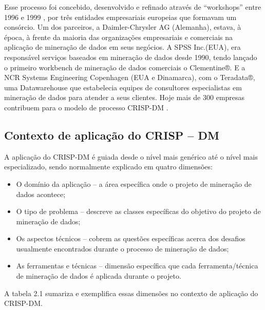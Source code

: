 Esse processo foi concebido, desenvolvido e refinado através de ``workshops'' entre 1996 e 1999 \cite{Crisp2000}, por três entidades empresariais europeias que 
formavam um consórcio. Um dos parceiros, a Daimler-Chrysler AG (Alemanha), estava, à época, à frente da maioria das organizações empresariais e comerciais 
na aplicação de mineração de dados em seus negócios. A
SPSS Inc.(EUA), era responsável serviços baseados em mineração de dados desde 1990, tendo lançado o primeiro workbench de mineração 
de dados comerciais o Clementine®. 
E a NCR Systems Engineering Copenhagen (EUA e Dinamarca), com o Teradata®, uma Datawarehouse que estabelecia equipes de consultores especialistas em mineração 
de dados para atender a seus clientes. Hoje mais de 300 empresas contribuem para o modelo de processo CRISP-DM \cite{chapman2000crisp}.

\subsection{Contexto de aplicação do CRISP -- DM}

A aplicação do CRISP-DM \cite{Crisp2000} é guiada desde o nível mais genérico até o nível mais 
especializado, sendo normalmente explicado em quatro dimensões:

\begin{itemize}
 \item O domínio da aplicação -- a área específica onde o projeto de mineração de dados acontece;
 \item O tipo de problema -- descreve as classes específicas do objetivo do projeto de mineração de dados;
 \item Os aspectos técnicos -- cobrem as questões específicas acerca dos desafios usualmente encontrados durante o processo de mineração de dados; 
 \item As ferramentas e técnicas -- dimensão específica que cada ferramenta/técnica de mineração de dados é aplicada durante o projeto.
\end{itemize}

A tabela 2.1 sumariza e exemplifica essas dimensões no contexto de aplicação do CRISP-DM.

